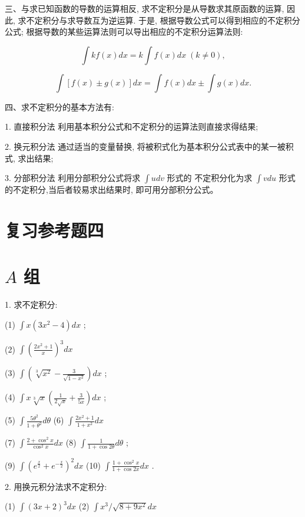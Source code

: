 \documentclass[10pt]{article}
\begin{document}
三、与求已知函数的导数的运算相反, 求不定积分是从导数求其原函数的运算, 因此, 求不定积分与求导数互为逆运算. 于是, 根据导数公式可以得到相应的不定积分公式; 根据导数的某些运算法则可以导出相应的不定积分运算法则:

\[
\int {kf}\left( x\right) {dx} = k\int f\left( x\right) {dx}\;\left( {k \neq 0}\right) ,
\]

\[
\int \left\lbrack {f\left( x\right) \pm g\left( x\right) }\right\rbrack {dx} = \int f\left( x\right) {dx} \pm \int g\left( x\right) {dx}.
\]

四、求不定积分的基本方法有:

1. 直接积分法 利用基本积分公式和不定积分的运算法则直接求得结果;

2. 换元积分法 通过适当的变量替换, 将被积式化为基本积分公式表中的某一被积式, 求出结果;

3. 分部积分法 利用分部积分公式将求 \(\int {udv}\) 形式的 不定积分化为求 \(\int {vdu}\) 形式的不定积分,当后者较易求出结果时, 即可用分部积分公式。

\section*{复习参考题四}

\section*{\(A\) 组}

1. 求不定积分:

(1) \(\int x\left( {3{x}^{2} - 4}\right) {dx}\) ;

(2) \(\int {\left( \frac{2{x}^{2} + 1}{x}\right) }^{3}{dx}\)

(3) \(\int \left( {\sqrt[3]{{x}^{2}} - \frac{3}{\sqrt{1 - {x}^{2}}}}\right) {dx}\) ;

(4) \(\int x\sqrt[3]{x}\left( {\frac{1}{2\sqrt{x}} + \frac{3}{5x}}\right) {dx}\) ;

(5) \(\int \frac{5{\theta }^{2}}{1 + {\theta }^{2}}{d\theta }\) (6) \(\int \frac{2{x}^{2} + 1}{1 + {x}^{2}}{dx}\)

(7) \(\int \frac{2 + {\cos }^{2}x}{{\cos }^{2}x}{dx}\) (8) \(\int \frac{1}{1 + \cos {2\theta }}{d\theta }\) ;

(9) \(\int {\left( {e}^{\frac{x}{2}} + {e}^{-\frac{x}{2}}\right) }^{2}{dx}\) (10) \(\int \frac{1 + {\cos }^{2}x}{1 + \cos {2x}}{dx}\) .

2. 用换元积分法求不定积分:

(1) \(\int {\left( 3x + 2\right) }^{3}{dx}\) (2) \(\int {x}^{3}/\sqrt{8 + 9{x}^{2}}{dx}\)
\end{document}
